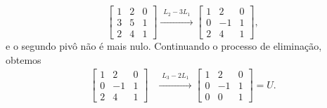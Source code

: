 \documentclass[leqno]{article}
\numberwithin{equation}{section}
\begin{document}
\begin{enumerate}
\begin{enumerate}
\begin{sol}
                        \begin{equation*}
                            \begin{bmatrix}
                                1 & 2 & 0 \\
                                3 & 5 & 1 \\
                                2 & 4 & 1
                            \end{bmatrix}
                            \xrightarrow{
                                \begin{array}{l}
                                    L_{ 2 } - 3L_{ 1 }
                                \end{array}
                            }
                            \begin{bmatrix}
                                1 & 2 & 0 \\
                                0 & -1 & 1 \\
                                2 & 4 & 1
                            \end{bmatrix}
                        ,\end{equation*}
                        e o segundo pivô não é mais nulo.
                        Continuando o processo de eliminação, obtemos
                        \begin{align*}
                            \begin{bmatrix}
                                1 & 2 & 0 \\
                                0 & -1 & 1 \\
                                2 & 4 & 1
                            \end{bmatrix}
                                &\xrightarrow{
                                    \begin{array}{l}
                                        L_{ 3 } - 2 L_{ 1 }
                                    \end{array}
                                }
                                \begin{bmatrix}
                                    1 & 2 & 0 \\
                                    0 & -1 & 1 \\
                                    0 & 0 & 1
                                \end{bmatrix} = U
                            .\end{align*}

\end{sol}
\end{enumerate}
\end{enumerate}
\end{document}
